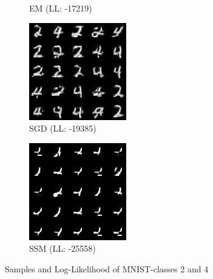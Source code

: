 \begin{figure}[H]
\begin{subfigure}[b]{0.24\textwidth}
        \caption{EM (LL: -17219)}
    \end{subfigure}
    \begin{subfigure}[b]{0.24\textwidth}
        \centering
        \includegraphics[width=\textwidth]{figures/einsum/mnist/[2, 4]_SGD.png} 
        \caption{SGD (LL: -19385)}
    \end{subfigure}
    \begin{subfigure}[b]{0.24\textwidth}
        \centering
        \includegraphics[width=\textwidth]{figures/einsum/mnist/[2, 4]_SSM.png}
        \caption{SSM (LL: -25558)}
    \end{subfigure}
    \caption{Samples and Log-Likelihood of MNIST-classes 2 and 4}
    \label{fig:mnist7}
\end{figure}

